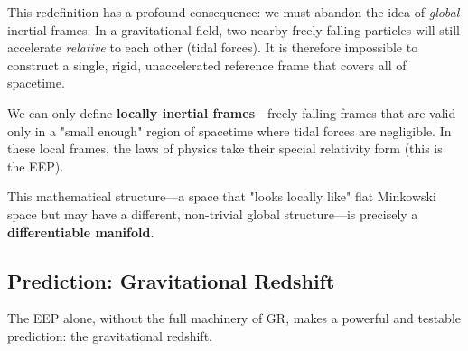 \documentclass[11pt, a4paper]{report}
\begin{document}
This redefinition has a profound consequence: we must abandon the idea of \emph{global} inertial frames. In a gravitational field, two nearby freely-falling particles will still accelerate \emph{relative} to each other (tidal forces). It is therefore impossible to construct a single, rigid, unaccelerated reference frame that covers all of spacetime.










We can only define \textbf{locally inertial frames}---freely-falling frames that are valid only in a "small enough" region of spacetime where tidal forces are negligible. In these local frames, the laws of physics take their special relativity form (this is the EEP).

This mathematical structure---a space that "looks locally like" flat Minkowski space but may have a different, non-trivial global structure---is precisely a \textbf{differentiable manifold}.

\subsection*{Prediction: Gravitational Redshift}
The EEP alone, without the full machinery of GR, makes a powerful and testable prediction: the gravitational redshift.
\end{document}
